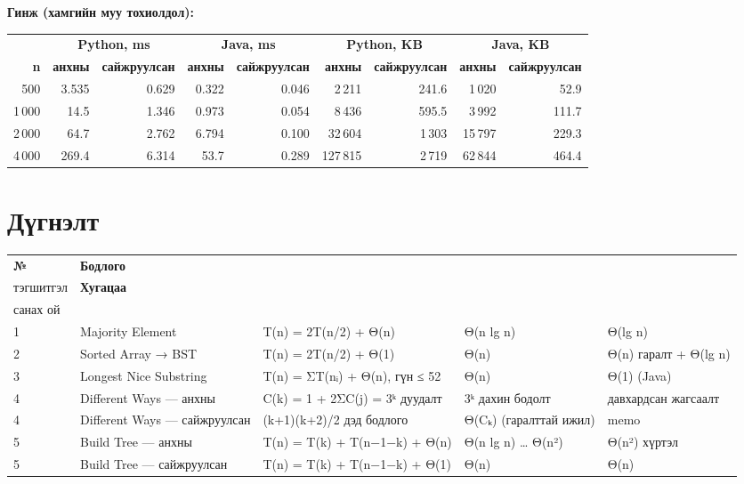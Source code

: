 \documentclass[11pt,a4paper]{article}
\begin{document}
\textbf{Гинж (хамгийн муу тохиолдол):}

\begin{center}
\scriptsize
\setlength{\tabcolsep}{4pt}
\begin{tabular}{rrrrrrrrr}
\toprule
\multicolumn{1}{c}{} & \multicolumn{2}{c}{\textbf{Python, ms}} & \multicolumn{2}{c}{\textbf{Java, ms}} & \multicolumn{2}{c}{\textbf{Python, KB}} & \multicolumn{2}{c}{\textbf{Java, KB}} \\
\cmidrule(lr){2-3} \cmidrule(lr){4-5} \cmidrule(lr){6-7} \cmidrule(lr){8-9}
\textbf{n} & \textbf{анхны} & \textbf{сайжруулсан} & \textbf{анхны} & \textbf{сайжруулсан} & \textbf{анхны} & \textbf{сайжруулсан} & \textbf{анхны} & \textbf{сайжруулсан} \\
\midrule
500 & 3.535 & 0.629 & 0.322 & 0.046 & 2\,211 & 241.6 & 1\,020 & 52.9 \\
1\,000 & 14.5 & 1.346 & 0.973 & 0.054 & 8\,436 & 595.5 & 3\,992 & 111.7 \\
2\,000 & 64.7 & 2.762 & 6.794 & 0.100 & 32\,604 & 1\,303 & 15\,797 & 229.3 \\
4\,000 & 269.4 & 6.314 & 53.7 & 0.289 & 127\,815 & 2\,719 & 62\,844 & 464.4 \\
\bottomrule
\end{tabular}
\end{center}

\section{Дүгнэлт}

\begin{center}
\footnotesize
\begin{tabularx}{\linewidth}{ll>{\raggedright\arraybackslash}Xll}
\toprule
\textbf{№} & \textbf{Бодлого} & \textbf{\begin{tabular}[b]{@{}l@{}}Дахин дуудах \\ тэгшитгэл\end{tabular}} & \textbf{Хугацаа} & \textbf{\begin{tabular}[b]{@{}l@{}}Нэмэлт \\ санах ой\end{tabular}} \\
\midrule
1 & Majority Element & T(n) = 2T(n/2) + Θ(n) & Θ(n lg n) & Θ(lg n) \\
2 & Sorted Array → BST & T(n) = 2T(n/2) + Θ(1) & Θ(n) & Θ(n) гаралт + Θ(lg n) \\
3 & Longest Nice Substring & T(n) = ΣT(nᵢ) + Θ(n), гүн ≤ 52 & Θ(n) & Θ(1) (Java) \\
4 & Different Ways — анхны & C(k) = 1 + 2ΣC(j) = 3ᵏ дуудалт & 3ᵏ дахин бодолт & давхардсан жагсаалт \\
4 & Different Ways — сайжруулсан & (k+1)(k+2)/2 дэд бодлого & Θ(Cₖ) (гаралттай ижил) & memo \\
5 & Build Tree — анхны & T(n) = T(k) + T(n−1−k) + Θ(n) & Θ(n lg n) … Θ(n²) & Θ(n²) хүртэл \\
5 & Build Tree — сайжруулсан & T(n) = T(k) + T(n−1−k) + Θ(1) & Θ(n) & Θ(n) \\
\bottomrule
\end{tabularx}
\end{center}
\end{document}

